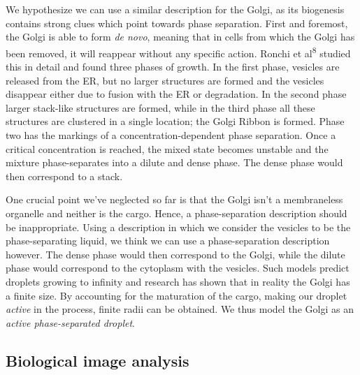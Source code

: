 \documentclass{Dissertate}
\begin{document}
We hypothesize we can use a similar description for the Golgi, as its
biogenesis contains strong clues which point towards phase separation.
First and foremost, the Golgi is able to form \emph{de novo}, meaning
that in cells from which the Golgi has been removed, it will reappear
without any specific action. Ronchi et al\textsuperscript{8} studied
this in detail and found three phases of growth. In the first phase,
vesicles are released from the ER, but no larger structures are formed
and the vesicles disappear either due to fusion with the ER or
degradation. In the second phase larger stack-like structures are
formed, while in the third phase all these structures are clustered in a
single location; the Golgi Ribbon is formed. Phase two has the markings
of a concentration-dependent phase separation. Once a critical
concentration is reached, the mixed state becomes unstable and the
mixture phase-separates into a dilute and dense phase. The dense phase
would then correspond to a stack.

One crucial point we've neglected so far is that the Golgi isn't a
membraneless organelle and neither is the cargo. Hence, a
phase-separation description should be inappropriate. Using a
description in which we consider the vesicles to be the phase-separating
liquid, we think we can use a phase-separation description however. The
dense phase would then correspond to the Golgi, while the dilute phase
would correspond to the cytoplasm with the vesicles. Such models predict
droplets growing to infinity and research has shown that in reality the
Golgi has a finite size. By accounting for the maturation of the cargo,
making our droplet \emph{active} in the process, finite radii can be
obtained. We thus model the Golgi as an \emph{active phase-separated
droplet}.

\hypertarget{biological-image-analysis}{%
\subsection{Biological image analysis}\label{biological-image-analysis}}
\end{document}
